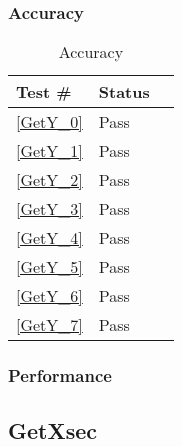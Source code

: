 \documentclass[12pt]{article}
\begin{document}
	\subsubsection{Accuracy}
		\begin{table}[H]
		\centering
		\caption{Accuracy}\label{GetY_acc}
		\begin{tabular}{lll}
		\toprule
		\bf Test \# & Status \\\midrule
		\ref{GetY_0} & Pass\\
		\ref{GetY_1} & Pass\\
		\ref{GetY_2} & Pass\\
		\ref{GetY_3} & Pass\\
		\ref{GetY_4} & Pass\\
		\ref{GetY_5} & Pass\\
		\ref{GetY_6} & Pass\\
		\ref{GetY_7} & Pass\\
		\bottomrule
		\end{tabular}
		\end{table}
	\subsubsection{Performance}

\subsection{GetXsec} %
\end{document}
